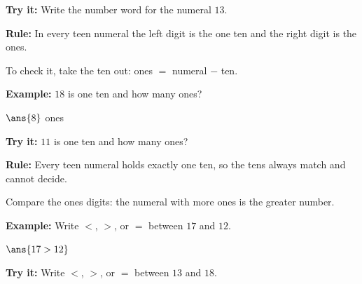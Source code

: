\documentclass[12pt]{article}
\begin{document}
\begin{tryitbox}
\textbf{Try it:} \quad Write the number word for the numeral $13$.\\[2pt]
\end{tryitbox}


\begin{formulabox}
\textbf{Rule:} In every teen numeral the left digit is the one ten and the right digit is the ones.\par
To check it, take the ten out: \quad ones $=$ numeral $-$ ten.
\end{formulabox}

\begin{examplebox}
\textbf{Example:} \quad $18$ is one ten and how many ones?

$\ans{8}$ ones
\end{examplebox}

\begin{tryitbox}
\textbf{Try it:} \quad $11$ is one ten and how many ones?\\[2pt]
\end{tryitbox}


\begin{formulabox}
\textbf{Rule:} Every teen numeral holds exactly one ten, so the tens always match and cannot decide.\par
Compare the ones digits: the numeral with more ones is the greater number.
\end{formulabox}

\begin{examplebox}
\textbf{Example:} \quad Write $<$, $>$, or $=$ between $17$ and $12$.

$\ans{17 > 12}$
\end{examplebox}

\begin{tryitbox}
\textbf{Try it:} \quad Write $<$, $>$, or $=$ between $13$ and $18$.\\[2pt]
\end{tryitbox}
\end{document}

